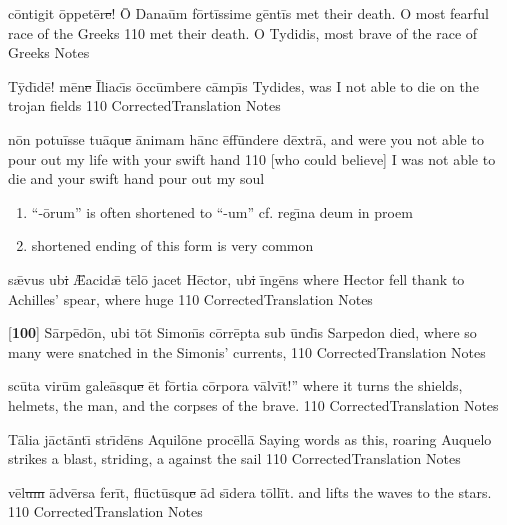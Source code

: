 \latline
  {c\=ont\-ig\-it \=opp\-et\=er\sout{e}!  \={\macron O} D\-an\-a\=um f\=ort\=iss\-im\-e g\=ent\=is}
  { met their death.  O most fearful race of the Greeks }
  {110}
  { met their death.  O Tydidis, most brave of the race of Greeks }
  { Notes }


\latline
  {T\={\macron y}d\={\macron \i}d\={\macron e}!  m\={\macron e}n\sout{e }\={\macron I}l\-i\-ac\={\macron \i}s \=occ\=umb\-er\-e c\=amp\={\macron \i}s}
  { Tydides, was I not able to die on the trojan fields }
  {110}
  { CorrectedTranslation }
  { Notes }




\latline
  {n\={\macron o}n p\-ot\-u\=iss\-e t\-u\={\macron a}qu\sout{e }\=an\-im\-am h\=anc \=eff\=und\-er\-e d\=extr\={\macron a},}
  { and were you not able to pour out my life with your swift hand }
  {110}
  { [who could believe] I was not able to die and your swift hand pour out my soul }
  { \begin{enumerate}
  	\item ``-\={o}rum'' is often shortened to ``-um'' cf. reg\={\i}na deum in proem
  	\item shortened ending of this form is very common
  \end{enumerate} }


\latline
  {s\={\ae}v\-us \-ub\sout{i }\={\AE}a\-c\-id\={\ae} t\={\macron e}l\={\macron o} j\-ac\-et H\=ect\-or, \-ub\sout{i }\=ing\={\macron e}ns}
  { where Hector fell thank to Achilles' spear, where huge }
  {110}
  { CorrectedTranslation }
  { Notes }


\latline
  {[\textbf{100}] S\=arp\={\macron e}d\={\macron o}n, \-ub\-i t\=ot S\-im\-on\={\macron \i}s c\=orr\=ept\-a s\-ub \=und\={\macron \i}s}
  { Sarpedon died, where so many were snatched in the Simonis' currents,  }
  {110}
  { CorrectedTranslation }
  { Notes }




\latline
  {sc\={\macron u}t\-a v\-ir\=um g\-al\-e\={\macron a}squ\sout{e }\=et f\=ort\-i\-a c\=orp\-or\-a v\=alv\=it!''}
  { where it turns the shields, helmets, the man, and the corpses of the brave. }
  {110}
  { CorrectedTranslation }
  { Notes }


\latline
  {T\={\macron a}l\-i\-a j\=act\=ant\={\macron \i} str\={\macron \i}d\={\macron e}ns \-Aqu\-il\={\macron o}n\-e pr\-oc\=ell\=a}
  { Saying words as this, roaring Auquelo strikes a blast, striding, a against the sail }
  {110}
  { CorrectedTranslation }
  { Notes }


\latline
  {v\={\macron e}l\sout{um }\=adv\=ers\-a f\-er\=it, fl\={\macron u}ct\={\macron u}squ\sout{e }\=ad s\={\macron \i}d\-er\-a t\=oll\=it.}
  {  and lifts the waves to the stars. }
  {110}
  { CorrectedTranslation }
  { Notes }




